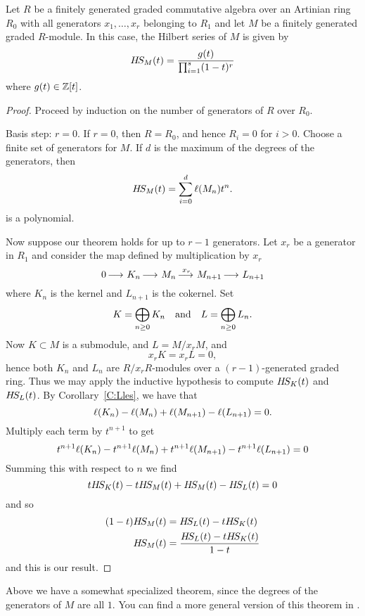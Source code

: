 \documentclass{ximera}
\begin{document}
\begin{theorem}\label{T:HS}
  Let $R$ be a finitely generated graded commutative algebra over an
  Artinian ring $R_0$ with all generators $x_1,\dots,x_r$ belonging to
  $R_1$ and let $M$ be a finitely generated graded $R$-module. In this
  case, the Hilbert series of $M$ is given by
  \[
  H\!S_M(t) = \frac{g(t)}{\prod_{i=1}^s(1-t)^r}
  \]
  where $g(t)\in\mathbb Z[t]$.
  \begin{proof}
    Proceed by induction on the number of generators of $R$ over
    $R_0$.

    Basis step: $r =0$. If $r=0$, then $R=R_0$, and hence $R_i = 0$
    for $i>0$. Choose a finite set of generators for $M$. If $d$ is
    the maximum of the degrees of the generators, then 
    \[
    H\!S_M(t) = \sum_{i=0}^d \ell(M_n) t^n.
    \]
    is a polynomial.

    Now suppose our theorem holds for up to $r-1$ generators. Let
    $x_r$ be a generator in $R_1$ and consider the map defined by
    multiplication by $x_r$
    \[
    0\mathop{\longrightarrow\,}\limits K_n \mathop{\longrightarrow\,}\limits M_n \mathop{\longrightarrow\,}\limits^{x_r} M_{n+1} \mathop{\longrightarrow\,}\limits L_{n+1}
    \]
    where $K_n$ is the kernel and $L_{n+1}$ is the cokernel. Set
    \[
    K = \bigoplus_{n\ge 0} K_n\quad\text{and}\quad L = \bigoplus_{n\ge 0} L_n.
    \]
    Now $K\subset M$ is a submodule, and $L = M/x_r M$, and
    \[
    x_r K = x_r L = 0,
    \]
    hence both $K_n$ and $L_n$ are $R/x_r R$-modules over a
    $(r-1)$-generated graded ring. Thus we may apply the inductive
    hypothesis to compute $H\!S_K(t)$ and $H\!S_L(t)$. By
    Corollary~\ref{C:Lles}, we have that
    \[
    \ell(K_n)-\ell(M_n) + \ell(M_{n+1}) -\ell(L_{n+1}) = 0.
    \]
    Multiply each term by $t^{n+1}$ to get
    \[
    t^{n+1}\ell(K_n)-t^{n+1}\ell(M_n) + t^{n+1}\ell(M_{n+1}) -t^{n+1}\ell(L_{n+1}) = 0
    \]
    Summing this with respect to $n$ we find
    \[
    tH\!S_K(t) - tH\!S_M(t)  + H\!S_M(t) - H\!S_L(t) = 0
    \]
    and so
    \begin{align*}
      (1-t)H\!S_M(t) &= H\!S_L(t) - tH\!S_K(t)\\
      H\!S_M(t) &= \frac{H\!S_L(t) - tH\!S_K(t)}{1-t}
    \end{align*}
    and this is our result.
  \end{proof}
\end{theorem}

\begin{remark}
  Above we have a somewhat specialized theorem, since the degrees of
  the generators of $M$ are all $1$. You can find a more general
  version of this theorem in \cite{AM1969,hM1986}.
\end{remark}
\end{document}

